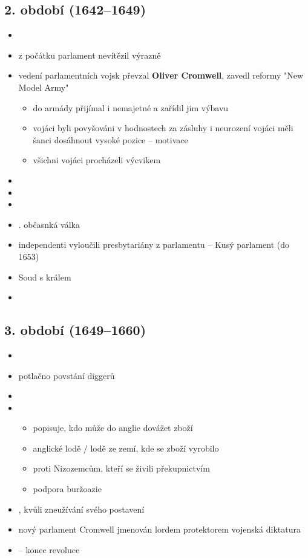\subsection{2. období (1642--1649)}
\begin{itemize}
\item {}
\item z počátku parlament nevítězil výrazně
\item vedení parlamentních vojsk převzal \textbf{Oliver Cromwell}, zavedl reformy \ra "New Model Army"
	\begin{itemize}
	\item do armády přijímal i nemajetné a zařídil jim výbavu
	\item vojáci byli povyšováni v hodnostech za zásluhy \ra i neurození vojáci měli šanci dosáhnout vysoké pozice -- motivace
	\item všichni vojáci procházeli výcvikem
	\end{itemize}
\item {}
\item {}
\item {}
\item {}. občasnká válka
\item independenti vyloučili presbytariány z parlamentu -- Kusý parlament (do 1653)
\item Soud s králem
\item {}
\end{itemize}

\subsection{3. období (1649--1660)}
\begin{itemize}
\item {}
\item potlačno povstání diggerů
\item {}
\item {}
	\begin{itemize}
	\item popisuje, kdo může do anglie dovážet zboží
	\item anglické lodě / lodě ze zemí, kde se zboží vyrobilo
	\item proti Nizozemcům, kteří se živili překupnictvím
	\item podpora buržoazie 
	\end{itemize}
\item {}, kvůli zneužívání svého postavení
\item nový parlament \ra Cromwell jmenován lordem protektorem \ra vojenská diktatura
\item {} -- konec revoluce
\end{itemize}

